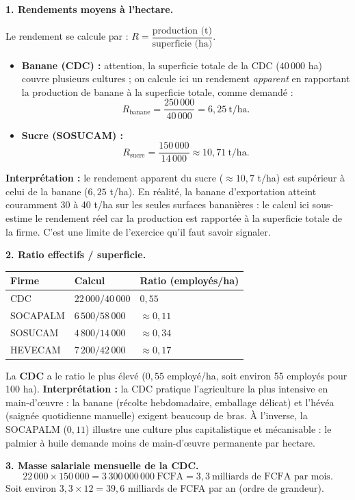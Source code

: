 \documentclass[11pt]{article}
\begin{document}
\begin{corrige}
\textbf{1. Rendements moyens à l'hectare.}

Le rendement se calcule par : $R = \dfrac{\text{production (t)}}{\text{superficie (ha)}}$.

\begin{itemize}
\item \textbf{Banane (CDC) :} attention, la superficie totale de la CDC ($40\,000$ ha) couvre plusieurs cultures ; on calcule ici un rendement \emph{apparent} en rapportant la production de banane à la superficie totale, comme demandé :
\[ R_{\text{banane}} = \frac{250\,000}{40\,000} = 6{,}25 \ \text{t/ha}. \]
\item \textbf{Sucre (SOSUCAM) :}
\[ R_{\text{sucre}} = \frac{150\,000}{14\,000} \approx 10{,}71 \ \text{t/ha}. \]
\end{itemize}

\textbf{Interprétation :} le rendement apparent du sucre ($\approx 10{,}7$ t/ha) est supérieur à celui de la banane ($6{,}25$ t/ha). En réalité, la banane d'exportation atteint couramment 30 à 40 t/ha sur les seules surfaces bananières : le calcul ici sous-estime le rendement réel car la production est rapportée à la superficie totale de la firme. C'est une limite de l'exercice qu'il faut savoir signaler.

\textbf{2. Ratio effectifs / superficie.}

\begin{center}
\begin{tabularx}{\linewidth}{|l|X|X|}\hline
\rowcolor{popblueL} \textbf{Firme} & \textbf{Calcul} & \textbf{Ratio (employés/ha)} \\ \hline
CDC & $22\,000 / 40\,000$ & $0{,}55$ \\ \hline
SOCAPALM & $6\,500 / 58\,000$ & $\approx 0{,}11$ \\ \hline
SOSUCAM & $4\,800 / 14\,000$ & $\approx 0{,}34$ \\ \hline
HEVECAM & $7\,200 / 42\,000$ & $\approx 0{,}17$ \\ \hline
\end{tabularx}
\end{center}

La \textbf{CDC} a le ratio le plus élevé ($0{,}55$ employé/ha, soit environ 55 employés pour 100 ha). \textbf{Interprétation :} la CDC pratique l'agriculture la plus intensive en main-d'œuvre : la banane (récolte hebdomadaire, emballage délicat) et l'hévéa (saignée quotidienne manuelle) exigent beaucoup de bras. À l'inverse, la SOCAPALM ($0{,}11$) illustre une culture plus capitalistique et mécanisable : le palmier à huile demande moins de main-d'œuvre permanente par hectare.

\textbf{3. Masse salariale mensuelle de la CDC.}
\[ 22\,000 \times 150\,000 = 3\,300\,000\,000 \ \text{FCFA} = 3{,}3 \ \text{milliards de FCFA par mois}. \]
Soit environ $3{,}3 \times 12 = 39{,}6$ milliards de FCFA par an (ordre de grandeur).
\end{corrige}
\end{document}
